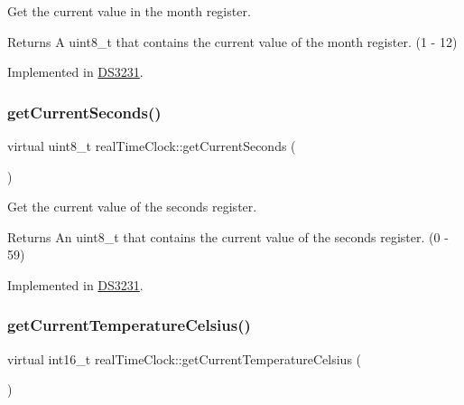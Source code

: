 Get the current value in the month register. 

\begin{DoxyReturn}{Returns}
A uint8\+\_\+t that contains the current value of the month register. (1 -\/ 12) 
\end{DoxyReturn}


Implemented in \mbox{\hyperlink{class_d_s3231_a8d7a965802afacc16b4d5af86e0ed11e}{D\+S3231}}.

\mbox{\label{classreal_time_clock_a46bfe69dc650cc27e648ac7adb03afd0}} 
\subsubsection{\texorpdfstring{get\+Current\+Seconds()}{getCurrentSeconds()}}
{\footnotesize\ttfamily virtual uint8\+\_\+t real\+Time\+Clock\+::get\+Current\+Seconds (\begin{DoxyParamCaption}{ }\end{DoxyParamCaption})\hspace{0.3cm}{\ttfamily [pure virtual]}}



Get the current value of the seconds register. 

\begin{DoxyReturn}{Returns}
An uint8\+\_\+t that contains the current value of the seconds register. (0 -\/ 59) 
\end{DoxyReturn}


Implemented in \mbox{\hyperlink{class_d_s3231_a8a5357eae07991d94f8f7610a3f3073a}{D\+S3231}}.

\mbox{\label{classreal_time_clock_ac662348fcf7b5fb51fdcf79f83958a33}} 
\subsubsection{\texorpdfstring{get\+Current\+Temperature\+Celsius()}{getCurrentTemperatureCelsius()}}
{\footnotesize\ttfamily virtual int16\+\_\+t real\+Time\+Clock\+::get\+Current\+Temperature\+Celsius (\begin{DoxyParamCaption}{ }\end{DoxyParamCaption})\hspace{0.3cm}{\ttfamily [pure virtual]}}



